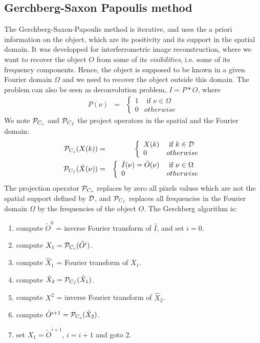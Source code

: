 \documentclass[11pt,a4paper]{article}
\begin{document}
\subsection{Gerchberg-Saxon Papoulis method}
The Gerchberg-Saxon-Papoulis \cite{rest:gerchberb74} method is iterative,
and uses the a priori information on the object, which are its positivity
and its support in the spatial domain. It was developped for interferrometric
image reconstruction, where we want to recover the object $O$ from some
of its {\em visibilities}, i.e. some of its frequency components. Hence,
the object is supposed to be known in a given Fourier domain $\Omega$ and we 
need to recover the object outside this domain. The problem can also be
seen as deconvolution problem, $I = P*O$, where
\begin{eqnarray}
  P(\nu)  & =  & \left\{
  \begin{array}{ll}
  1    & \mbox{ if }  \nu \in  \Omega    \\
   0   &  otherwise
  \end{array}
  \right.  
\end{eqnarray}
We note ${\cal P}_{C_s}$ and
 ${\cal P}_{C_f}$ the project operators in the spatial 
 and the Fourier domain:
\begin{eqnarray}
 {\cal P}_{C_s}(X(k))  & =  & \left\{
  \begin{array}{ll}
   X(k)    & \mbox{ if }  k \in {\cal D}    \\
   0   &  otherwise
  \end{array}
  \right.  \nonumber \\
 {\cal P}_{C_f}(\hat X(\nu)) & = & \left\{
  \begin{array}{ll}
    \hat I(\nu) = \hat O(\nu)    & \mbox{ if }  \nu \in \Omega    \\
  0 &  otherwise
  \end{array}
  \right.
\end{eqnarray}
The projection operator ${\cal P}_{C_s}$ replaces by zero all pixels values
which are not the spatial support defined by $\cal D$, and ${\cal P}_{C_f}$
replaces all frequencies in the Fourier domain $\Omega$ by the frequencies
of the object $O$. The Gerchberg algorithm is:
\begin{enumerate}
\item compute $\tilde O^0$ = inverse Fourier transform of  $\hat I$, and
set $i=0$.
\item compute $X_1 =  {\cal P}_{C_s}(\tilde O^i)$.
\item compute $\hat X_1$ = Fourier transform of $X_1$.
\item compute $\hat X_2 =  {\cal P}_{C_f}(\hat X_1)$.
\item compute $X^2$ = inverse Fourier transform of  $\hat X_2$.
\item compute $\tilde O^{i+1} = {\cal P}_{C_s}(\hat X_2)$.
\item set $X_1 = \tilde O^{i+1}$, $i=i+1$ and goto 2.
\end{enumerate}
\end{document}
